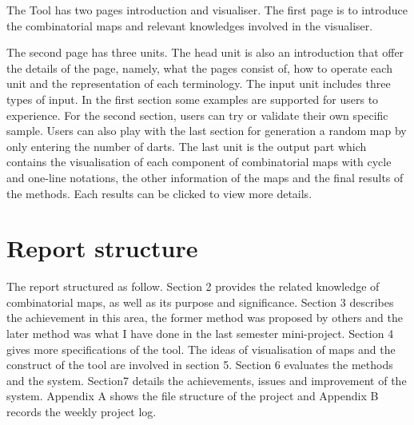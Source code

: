 The Tool has two pages introduction and visualiser. The first page is to introduce the combinatorial maps and relevant knowledges involved in the visualiser.

The second page has three units. The head unit is also an introduction that offer the details of the page, namely, what the pages consist of, how to operate each unit and the representation of each terminology.
The input unit includes three types of input. In the first section some examples are supported for users to experience. For the second section, users can try or validate their own specific sample. Users can also play with the last section for generation a random map by only entering the number of darts. The last unit is the output part which contains the visualisation of each component of combinatorial maps with cycle and one-line notations, the other information of the maps and the final results of the methods. Each results can be clicked to view more details.

\section{Report structure}

The report structured as follow. Section 2 provides the related knowledge of combinatorial maps, as well as its purpose and significance. Section 3 describes the achievement in this area, the former method was proposed by others and the later method was what I have done in the last semester mini-project. Section 4 gives more specifications of the tool. The ideas of visualisation of maps and the construct of the tool are involved in section 5. Section 6 evaluates the methods and the system. Section7 details the achievements, issues and improvement of the system. Appendix A shows the file structure of the project and Appendix B records the weekly project log.